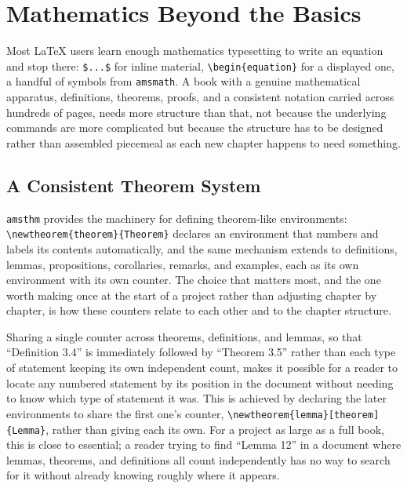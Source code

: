 \hypertarget{chapter-11-mathematics-beyond-the-basics}{%
\chapter{Mathematics Beyond the Basics}\label{chapter-11-mathematics-beyond-the-basics}}

Most LaTeX users learn enough mathematics typesetting to write an equation and stop there: \texttt{\$...\$} for inline material, \texttt{\textbackslash{}begin\{equation\}} for a displayed one, a handful of symbols from \texttt{amsmath}. A book with a genuine mathematical apparatus, definitions, theorems, proofs, and a consistent notation carried across hundreds of pages, needs more structure than that, not because the underlying commands are more complicated but because the structure has to be designed rather than assembled piecemeal as each new chapter happens to need something.

\hypertarget{a-consistent-theorem-system}{%
\section{A Consistent Theorem System}\label{a-consistent-theorem-system}}

\texttt{amsthm} provides the machinery for defining theorem-like environments: \texttt{\textbackslash{}newtheorem\{theorem\}\{Theorem\}} declares an environment that numbers and labels its contents automatically, and the same mechanism extends to definitions, lemmas, propositions, corollaries, remarks, and examples, each as its own environment with its own counter. The choice that matters most, and the one worth making once at the start of a project rather than adjusting chapter by chapter, is how these counters relate to each other and to the chapter structure.

Sharing a single counter across theorems, definitions, and lemmas, so that ``Definition 3.4'' is immediately followed by ``Theorem 3.5'' rather than each type of statement keeping its own independent count, makes it possible for a reader to locate any numbered statement by its position in the document without needing to know which type of statement it was. This is achieved by declaring the later environments to share the first one's counter, \texttt{\textbackslash{}newtheorem\{lemma\}{[}theorem{]}\{Lemma\}}, rather than giving each its own. For a project as large as a full book, this is close to essential; a reader trying to find ``Lemma 12'' in a document where lemmas, theorems, and definitions all count independently has no way to search for it without already knowing roughly where it appears.


